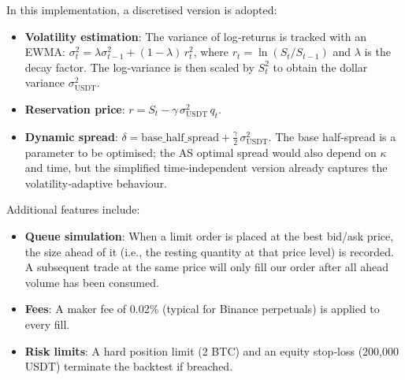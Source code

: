 \documentclass[11pt,a4paper]{article}
\begin{document}
In this implementation, a discretised version is adopted:
\begin{itemize}
    \item \textbf{Volatility estimation}: The variance of log‑returns is tracked with an EWMA: \(\sigma^2_{t} = \lambda \sigma^2_{t-1} + (1-\lambda)\, r_t^2\), where \(r_t = \ln(S_t / S_{t-1})\) and \(\lambda\) is the decay factor. The log‑variance is then scaled by \(S_t^2\) to obtain the dollar variance \(\sigma^2_{\text{USDT}}\).
    \item \textbf{Reservation price}: \(r = S_t - \gamma\, \sigma^2_{\text{USDT}}\, q_t\).
    \item \textbf{Dynamic spread}: \(\delta = \text{base\_half\_spread} + \frac{\gamma}{2}\, \sigma^2_{\text{USDT}}\). The base half‑spread is a parameter to be optimised; the AS optimal spread would also depend on \(\kappa\) and time, but the simplified time‑independent version already captures the volatility‑adaptive behaviour.
\end{itemize}

Additional features include:
\begin{itemize}
    \item \textbf{Queue simulation}: When a limit order is placed at the best bid/ask price, the size ahead of it (i.e., the resting quantity at that price level) is recorded. A subsequent trade at the same price will only fill our order after all ahead volume has been consumed.
    \item \textbf{Fees}: A maker fee of 0.02\% (typical for Binance perpetuals) is applied to every fill.
    \item \textbf{Risk limits}: A hard position limit (2 BTC) and an equity stop‑loss (200,000 USDT) terminate the backtest if breached.
\end{itemize}
\end{document}
